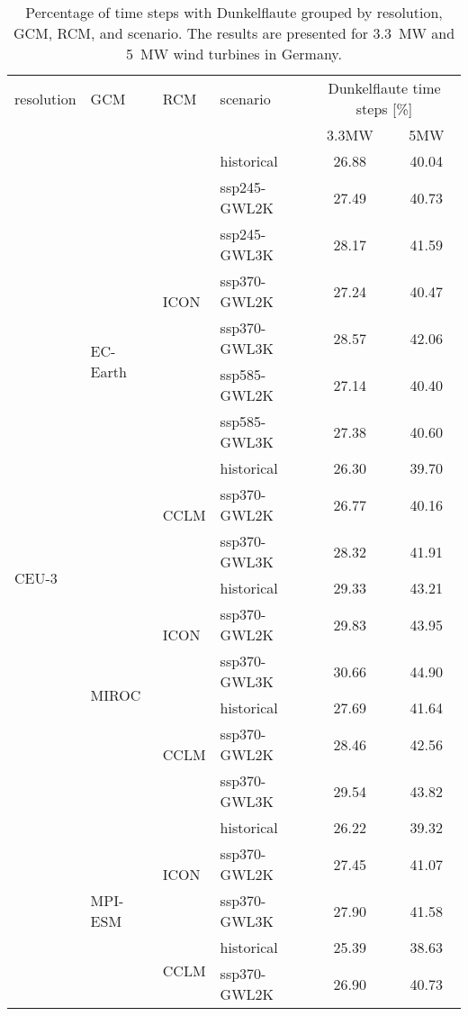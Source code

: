 \begin{table}[!htbp]
\centering
\caption{Percentage of time steps with Dunkelflaute grouped by resolution, GCM, RCM, and scenario. The results are presented for \qty{3.3}{\mega\watt} and \qty{5}{\mega\watt} wind turbines in Germany.}
\label{Table:Dunkelflaute_changes}
\begin{tabular}{lll|l|cc}
\toprule
resolution & GCM & RCM & scenario & \multicolumn{2}{c}{Dunkelflaute time steps [\%]} \\
 & & & & 3.3\si{\mega\watt} & 5\si{\mega\watt}  \\
\midrule
\multirow{22}{*}{CEU-3} & \multirow{10}{*}{EC-Earth} & \multirow{7}{*}{ICON} & historical & 26.88 & 40.04 \\
 &  &  & ssp245-GWL2K & 27.49 & 40.73 \\
 &  &  & ssp245-GWL3K & 28.17 & 41.59 \\
 &  &  & ssp370-GWL2K & 27.24 & 40.47 \\
 &  &  & ssp370-GWL3K & 28.57 & 42.06 \\
 &  &  & ssp585-GWL2K & 27.14 & 40.40 \\
 &  &  & ssp585-GWL3K & 27.38 & 40.60 \\
\cmidrule(lr){3-6}
 &  & \multirow{3}{*}{CCLM} & historical & 26.30 & 39.70 \\
 &  &  & ssp370-GWL2K & 26.77 & 40.16 \\
 &  &  & ssp370-GWL3K & 28.32 & 41.91 \\
\cmidrule(lr){3-6}
\cmidrule(lr){2-6}
 & \multirow{6}{*}{MIROC} & \multirow{3}{*}{ICON} & historical & 29.33 & 43.21 \\
 &  &  & ssp370-GWL2K & 29.83 & 43.95 \\
 &  &  & ssp370-GWL3K & 30.66 & 44.90 \\
\cmidrule(lr){3-6}
 &  & \multirow{3}{*}{CCLM} & historical & 27.69 & 41.64 \\
 &  &  & ssp370-GWL2K & 28.46 & 42.56 \\
 &  &  & ssp370-GWL3K & 29.54 & 43.82 \\
\cmidrule(lr){3-6}
\cmidrule(lr){2-6}
 & \multirow{6}{*}{MPI-ESM} & \multirow{3}{*}{ICON} & historical & 26.22 & 39.32 \\
 &  &  & ssp370-GWL2K & 27.45 & 41.07 \\
 &  &  & ssp370-GWL3K & 27.90 & 41.58 \\
\cmidrule(lr){3-6}
 &  & \multirow{3}{*}{CCLM} & historical & 25.39 & 38.63 \\
 &  &  & ssp370-GWL2K & 26.90 & 40.73 \\

\end{tabular}
\end{table}
